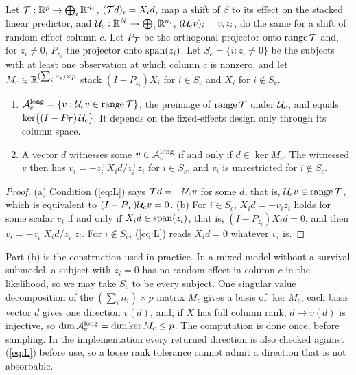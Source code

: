 Let $\mathcal{T}: \mathbb{R}^p \to \bigoplus_i \mathbb{R}^{n_i}$, $(\mathcal{T} d)_i = X_i d$, map a shift
of $\beta$ to its effect on the stacked linear predictor, and $\mathcal{U}_c: \mathbb{R}^N
\to \bigoplus_i \mathbb{R}^{n_i}$, $(\mathcal{U}_c v)_i = v_i z_i$, do the same for a shift
of random-effect column $c$. Let $P_{\mathcal{T}}$ be the orthogonal projector onto
$\operatorname{range} \mathcal{T}$ and, for $z_i \neq 0$, $P_{z_i}$ the projector onto
$\operatorname{span}(z_i)$. Let $S_c = \{i : z_i \neq 0\}$ be the subjects with at least
one observation at which column $c$ is nonzero, and let $M_c \in
\mathbb{R}^{(\sum_i n_i) \times p}$ stack $(I - P_{z_i}) X_i$ for $i \in S_c$ and
$X_i$ for $i \notin S_c$.

\begin{proposition}[Characterization]\label{prop:char}
\begin{enumerate}
\item[(a)] $\mathcal{A}_c^{\mathrm{long}} = \{v : \mathcal{U}_c v \in \operatorname{range} \mathcal{T}\}$, the
preimage of $\operatorname{range} \mathcal{T}$ under $\mathcal{U}_c$, and equals $\ker\{(I -
P_{\mathcal{T}})\,\mathcal{U}_c\}$. It depends on the fixed-effects design only
through its column space.
\item[(b)] A vector $d$ witnesses some $v \in \mathcal{A}_c^{\mathrm{long}}$ if and
only if $d \in \ker M_c$. The witnessed $v$ then has $v_i = -z_i^{\top}
X_i d / z_i^{\top} z_i$ for $i \in S_c$, and $v_i$ is unrestricted for
$i \notin S_c$.
\end{enumerate}
\end{proposition}

\begin{proof}
(a) Condition (\ref{eq:L}) says $\mathcal{T} d = -\mathcal{U}_c v$ for some $d$, that is,
$\mathcal{U}_c v \in \operatorname{range} \mathcal{T}$, which is equivalent to $(I - P_{\mathcal{T}})\mathcal{U}_c v = 0$.
(b) For $i \in S_c$, $X_i d = -v_i z_i$ holds for some scalar $v_i$ if and
only if $X_i d \in \operatorname{span}(z_i)$, that is, $(I - P_{z_i}) X_i d = 0$, and then
$v_i = -z_i^{\top} X_i d / z_i^{\top} z_i$. For $i \notin S_c$,
(\ref{eq:L}) reads $X_i d = 0$ whatever $v_i$ is.
\end{proof}

Part (b) is the construction used in practice. In a mixed model without
a survival submodel, a subject with $z_i = 0$ has no random effect in
column $c$ in the likelihood, so we may take $S_c$ to be every subject.
One singular value decomposition of the $(\sum_i n_i) \times
p$ matrix $M_c$ gives a basis of $\ker M_c$, each basis vector $d$ gives one
direction $v(d)$, and, if $X$ has full column rank, $d \mapsto v(d)$ is
injective, so $\dim \mathcal{A}_c^{\mathrm{long}} = \dim \ker M_c \leq p$. The
computation is done once, before sampling. In the
implementation every returned direction is also checked against
(\ref{eq:L}) before use, so a loose rank tolerance cannot admit a direction
that is not absorbable.

